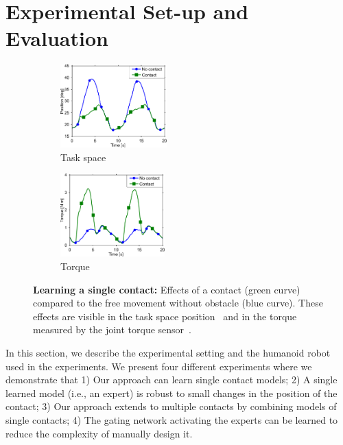 	

\section{Experimental Set-up and Evaluation}
\label{sec:results}


	\begin{figure}[t]
		\centering
		\begin{subfigure}[t]{0.48\hsize}
			\centering
			\includegraphics[height=3.2cm]{robertoICRA/fig/exp1_effectContactQ}%
			\caption{Task space}
			\label{fig:exp1:effects_contact:a}
		\end{subfigure}
		\hfill
		\begin{subfigure}[t]{0.48\hsize}
			\centering
			\includegraphics[height=3.2cm]{robertoICRA/fig/exp1_effectContactT}
			\caption{Torque}
			\label{fig:exp1:effects_contact:b}
		\end{subfigure}
		\caption{\textbf{Learning a single contact:} Effects of a contact (green curve) compared to the free movement without obstacle (blue curve). 
		These effects are visible in the task space position~ and in the torque measured by the joint torque sensor~.}
		\label{fig:exp1:effects_contact}
	\end{figure}


In this section, we describe the experimental setting and the humanoid robot~\robot{} used in the experiments.
We present four different experiments where we demonstrate that
1) Our approach can learn single contact models;
2) A single learned model (i.e., an expert) is robust to small changes in the position of the contact;
3) Our approach extends to multiple contacts by combining models of single contacts;
4) The gating network activating the experts can be learned to reduce the complexity of manually design it.

